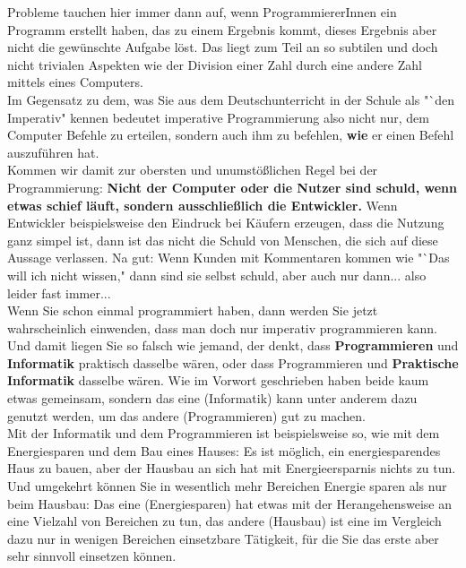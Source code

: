 Probleme tauchen hier immer dann auf, wenn ProgrammiererInnen ein Programm erstellt haben, das zu einem Ergebnis kommt, dieses Ergebnis aber nicht die gewünschte Aufgabe löst. Das liegt zum Teil an so subtilen und doch nicht trivialen Aspekten wie der Division einer Zahl durch eine andere Zahl mittels eines Computers.\\

Im Gegensatz zu dem, was Sie aus dem Deutschunterricht in der Schule als "`den Imperativ" kennen bedeutet imperative Programmierung also nicht nur, dem Computer Befehle zu erteilen, sondern auch ihm zu befehlen, \textbf{wie} er einen Befehl auszuführen hat.\\

Kommen wir damit zur obersten und unumstößlichen Regel bei der Programmierung: \label{rule001}\textbf{Nicht der Computer oder die Nutzer sind schuld, wenn etwas schief läuft, sondern ausschließlich die Entwickler.} Wenn Entwickler beispielsweise den Eindruck bei Käufern erzeugen, dass die Nutzung ganz simpel ist, dann ist das nicht die Schuld von Menschen, die sich auf diese Aussage verlassen. Na gut: Wenn Kunden mit Kommentaren kommen wie "`Das will ich nicht wissen," dann sind sie selbst schuld, aber auch nur dann... also leider fast immer...\\

Wenn Sie schon einmal programmiert haben, dann werden Sie jetzt wahrscheinlich einwenden, dass man doch nur imperativ programmieren kann. Und damit liegen Sie so falsch wie jemand, der denkt, dass \textbf{Programmieren} und \textbf{Informatik} praktisch dasselbe wären, oder dass Programmieren und \textbf{Praktische Informatik} dasselbe wären. Wie im Vorwort geschrieben haben beide kaum etwas gemeinsam, sondern das eine (Informatik) kann unter anderem dazu genutzt werden, um das andere (Programmieren) gut zu machen.\\

Mit der Informatik und dem Programmieren ist beispielsweise so, wie mit dem Energiesparen und dem Bau eines Hauses: Es ist möglich, ein energiesparendes Haus zu bauen, aber der Hausbau an sich hat mit Energieersparnis nichts zu tun. Und umgekehrt können Sie in wesentlich mehr Bereichen Energie sparen als nur beim Hausbau: Das eine (Energiesparen) hat etwas mit der Herangehensweise an eine Vielzahl von Bereichen zu tun, das andere (Hausbau) ist eine im Vergleich dazu nur in wenigen Bereichen einsetzbare Tätigkeit, für die Sie das erste aber sehr sinnvoll einsetzen können.\\

